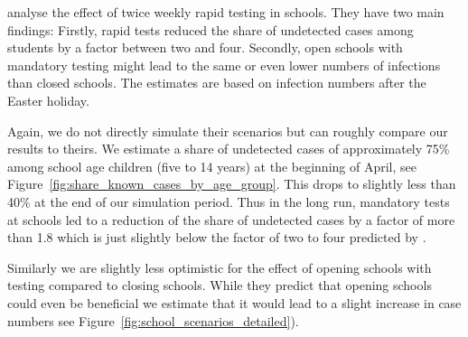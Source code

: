 \citet{Berger2021} analyse the effect of twice weekly rapid testing in schools. They
have two main findings: Firstly, rapid tests reduced the share of undetected cases among
students by a factor between two and four. Secondly, open schools with mandatory testing
might lead to the same or even lower numbers of infections than closed schools. The
estimates are based on infection numbers after the Easter holiday.

Again, we do not directly simulate their scenarios but can roughly compare our results
to theirs. We estimate a share of undetected cases of approximately 75\% among school
age children (five to 14 years) at the beginning of April, see
Figure~\ref{fig:share_known_cases_by_age_group}. This drops to slightly less than 40\%
at the end of our simulation period. Thus in the long run, mandatory tests at schools
led to a reduction of the share of undetected cases by a factor of more than 1.8 which
is just slightly below the factor of two to four predicted by \citet{Berger2021}.

Similarly we are slightly less optimistic for the effect of opening schools with testing
compared to closing schools. While they predict that opening schools could even be
beneficial we estimate that it would lead to a slight increase in case numbers see
Figure~\ref{fig:school_scenarios_detailed}).





\FloatBarrier
